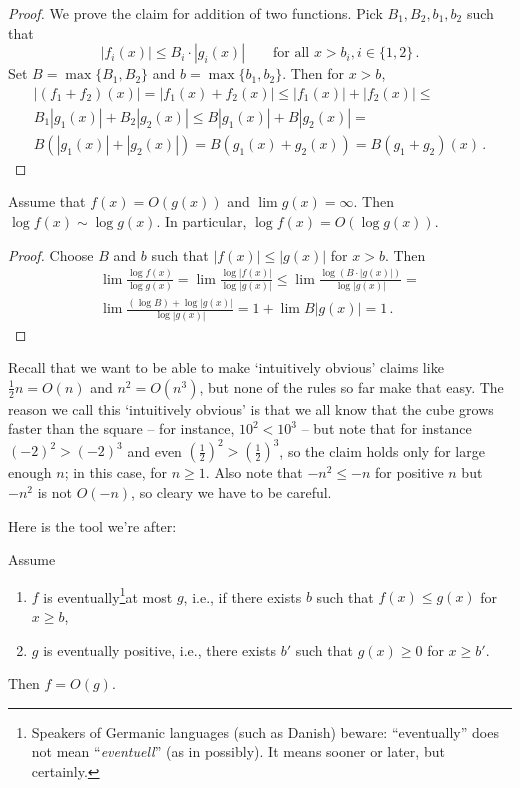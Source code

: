 \documentclass{tstextbook}
\begin{document}
\begin{proof}
    We prove the claim for addition of two functions.
    Pick $B_1,B_2, b_1, b_2$ such that \[
      |f_i(x)| \leq B_i\cdot |g_i(x)| \qquad\text{for all $x>b_i, i \in\{1,2\}$}\,.
    \]
    Set $B=\max\{B_1, B_2\}$ and $b=\max\{b_1, b_2\}$.
    Then for $x>b$, 
    \begin{multline*}
      |(f_1+f_2)(x)| =
      |f_1(x)+f_2(x)| \leq
      |f_1(x)| + |f_2(x)| \leq\\
      B_1|g_1(x)| + B_2|g_2(x)| \leq
      B|g_1(x)| + B|g_2(x)| =\\
      B(|g_1(x)| + |g_2(x)|) =
      B(g_1(x) + g_2(x)) =
      B(g_1 + g_2)(x)\,.
    \end{multline*}
  \end{proof}



\begin{theorem}[Logarithm]
  \label{prop: log big Oh}
  Assume that $f(x)=O(g(x))$ and $\lim g(x)=\infty$.
  Then $\log f(x) \sim \log g(x)$.
  In particular, $\log f(x)= O(\log g(x))$.
\end{theorem} 

\begin{proof}
  Choose $B$ and $b$ such that $|f(x)| \leq |g(x)|$ for $x> b$.
  Then \begin{multline*}
    \lim \frac{\log f(x)}{\log g(x)} = \lim \frac{\log |f(x)|}{\log |g(x)|} \leq \lim \frac{\log( B\cdot |g(x)|)}{\log |g(x)|}
    = \\
    \lim \frac{(\log B) + \log |g(x)|}{\log |g(x)|}=
    1 + \lim {B}{|g(x)|} = 1\,.
  \end{multline*}
\end{proof}

\medskip
Recall that we want to be able to make `intuitively obvious' claims like \(\frac{1}{2}n = O(n) \) and  \(n^2=O(n^3)\), but none of the rules so far make that easy.
The reason we call this `intuitively obvious' is that we all know that the cube grows faster than the square  – for instance,  \(10^2< 10^3\) – but note that for instance \((-2)^2 > (-2)^3\) and even \((\frac{1}{2})^2 > (\frac{1}{2})^3\), so the claim holds only for large enough \(n\); in this case, for \(n\geq 1\).
Also note that \(-n^2 \leq - n\) for positive \(n\) but  \( -n^2\) is not \(O(-n) \), so cleary we have to be careful.

Here is the tool we're after:

\begin{theorem}[Domination]\label{prop: D}
  Assume
  \begin{enumerate}
    \item\(f\) is eventually\footnote{
	Speakers of Germanic languages (such as Danish) beware: 
	``eventually'' does not mean ``\emph{eventuell}'' (as in possibly).
	It means sooner or later, but certainly.
      }at most \(g\), i.e.,  if there exists \(b\) such that  \(f(x) \leq g(x)\) for \(x\geq b\),
    \item \(g\) is eventually positive, i.e., there exists \(b'\) such that \(g(x) \geq 0\)  for \(x\geq b'\). 
  \end{enumerate}
  Then \(f= O(g)\).
\end{theorem}
\end{document}
